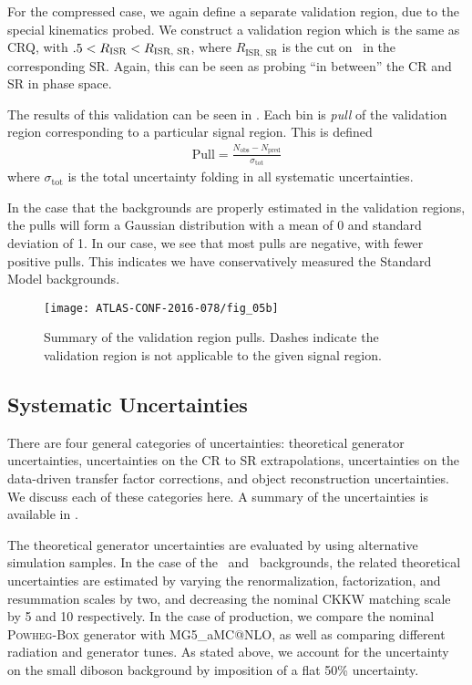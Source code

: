 For the compressed case, we again define a separate validation region, due to the special kinematics probed.
We construct a validation region which is the same as CRQ, with $.5 < R_{\text{ISR}} < R_{\text{ISR, SR}}$, where $R_{\text{ISR, SR}}$ is the cut on \risr~in the corresponding SR.
Again, this can be seen as probing ``in between'' the CR and SR in phase space.

The results of this validation can be seen in .
Each bin is \textit{pull} of the validation region corresponding to a particular signal region.
This is defined
\begin{align}
\text{Pull} = \frac{N_{\mathrm{obs}} - N_{\mathrm{pred}}}{\sigma_{\mathrm{tot}}}
\end{align}
where $\sigma_{\mathrm{tot}}$ is the total uncertainty folding in all systematic uncertainties.

In the case that the backgrounds are properly estimated in the validation regions, the pulls will form a Gaussian distribution with a mean of 0 and standard deviation of 1.
In our case, we see that most pulls are negative, with fewer positive pulls.
This indicates we have conservatively measured the Standard Model backgrounds.

\begin{figure}[tbp]
\caption{Summary of the validation region pulls.
Dashes indicate the validation region is not applicable to the given signal region.} \label{fig:vr_summary}
\texttt{[image: ATLAS-CONF-2016-078/fig\_05b]}
\end{figure}

\subsection{Systematic Uncertainties}

There are four general categories of uncertainties: theoretical generator uncertainties, uncertainties on the CR to SR extrapolations, uncertainties on the data-driven transfer factor corrections, and object reconstruction uncertainties.
We discuss each of these categories here.
A summary of the uncertainties is available in .


The theoretical generator uncertainties are evaluated by using alternative simulation samples.
In the case of the \zjets~and \wjets~backgrounds, the related theoretical uncertainties are estimated by varying the renormalization, factorization, and resummation scales by two, and decreasing the nominal CKKW matching scale by 5 \GeV and 10 \GeV respectively.
In the case of \ttbar production, we compare the nominal \textsc{Powheg-Box} generator with MG5\_aMC@NLO, as well as comparing different radiation and generator tunes.
As stated above, we account for the uncertainty on the small diboson background by imposition of a flat 50\% uncertainty.

